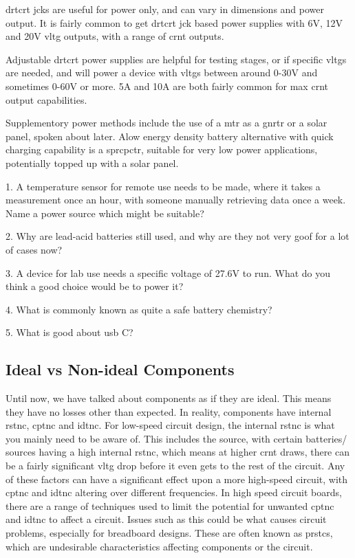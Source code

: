 \documentclass[a4paper,11pt]{report}
\newcommand{\Quiz}[1] %
{
\par\noindent %
\phantomsection %
\todo[inline, color=blue!30]{\textbf{#1}} %
\vspace{1em} %
}
\begin{document}
\gls{drtcrt} \gls{jck}s are useful for power only, and can vary in dimensions and power output. It is fairly common to get \gls{drtcrt} \gls{jck} based power supplies with 6V, 12V and 20V \gls{vltg} outputs, with a range of \gls{crnt} outputs.

Adjustable \gls{drtcrt} power supplies are helpful for testing stages, or if specific \gls{vltg}s are needed, and will power a device with \gls{vltg}s between around 0-30V and sometimes 0-60V or more. 5A and 10A are both fairly common for max \gls{crnt} output capabilities.

Supplementory power methods include the use of a \gls{mtr} as a \gls{gnrtr} or a solar panel, spoken about later. Alow energy density battery alternative with quick charging capability is a \gls{sprcpctr}, suitable for very low power applications, potentially topped up with a solar panel.

\Quiz{Quiz}

1. A temperature sensor for remote use needs to be made, where it takes a measurement once an hour, with someone manually retrieving data once a week. Name a power source which might be suitable?

2. Why are lead-acid batteries still used, and why are they not very goof for a lot of cases now?

3. A device for lab use needs a specific voltage of 27.6V to run. What do you think a good choice would be to power it?

4. What is commonly known as quite a safe battery chemistry?

5. What is good about \gls{usb} C?

\vspace*{1\baselineskip}

\subsection{Ideal vs Non-ideal Components}

Until now, we have talked about components as if they are ideal. This means they have no losses other than expected. In reality, components have internal \gls{rstnc}, \gls{cptnc} and \gls{idtnc}. For low-speed circuit design, the internal \gls{rstnc} is what you mainly need to be aware of. This includes the source, with certain batteries/ sources having a high internal \gls{rstnc}, which means at higher \gls{crnt} draws, there can be a fairly significant \gls{vltg} drop before it even gets to the rest of the circuit. Any of these factors can have a significant effect upon a more high-speed circuit, with \gls{cptnc} and \gls{idtnc} altering over different frequencies. In high speed circuit boards, there are a range of techniques used to limit the potential for unwanted \gls{cptnc} and \gls{idtnc} to affect a circuit. Issues such as this could be what causes circuit problems, especially for breadboard designs. These are often known as \gls{prstcs}, which are undesirable characteristics affecting components or the circuit.
\end{document}

